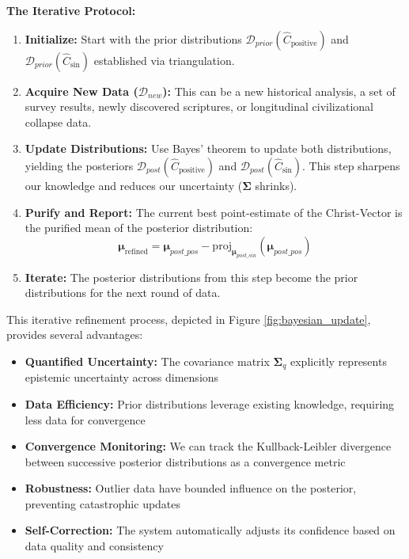 \documentclass[11pt,a4paper]{article}
\theoremstyle{definition}
\theoremstyle{remark}
\begin{document}
\textbf{The Iterative Protocol:}
\begin{enumerate}
    \item \textbf{Initialize:} Start with the prior distributions \(\mathcal{D}_{prior}(\hat{C}_{\text{positive}})\) and \(\mathcal{D}_{prior}(\hat{C}_{\text{sin}})\) established via triangulation.
    
    \item \textbf{Acquire New Data (\(\mathcal{D}_{new}\)):} This can be a new historical analysis, a set of survey results, newly discovered scriptures, or longitudinal civilizational collapse data.
    
    \item \textbf{Update Distributions:} Use Bayes' theorem to update both distributions, yielding the posteriors \(\mathcal{D}_{post}(\hat{C}_{\text{positive}})\) and \(\mathcal{D}_{post}(\hat{C}_{\text{sin}})\). This step sharpens our knowledge and reduces our uncertainty (\(\boldsymbol{\Sigma}\) shrinks).
    
    \item \textbf{Purify and Report:} The current best point-estimate of the Christ-Vector is the purified mean of the posterior distribution:
    \begin{equation}
    \boldsymbol{\mu}_{\text{refined}} = \boldsymbol{\mu}_{post\_pos} - \text{proj}_{\boldsymbol{\mu}_{post\_sin}}(\boldsymbol{\mu}_{post\_pos})
    \end{equation}
    
    \item \textbf{Iterate:} The posterior distributions from this step become the prior distributions for the next round of data.
\end{enumerate}

This iterative refinement process, depicted in Figure \ref{fig:bayesian_update}, provides several advantages:
\begin{itemize}
    \item \textbf{Quantified Uncertainty:} The covariance matrix \(\boldsymbol{\Sigma}_q\) explicitly represents epistemic uncertainty across dimensions
    \item \textbf{Data Efficiency:} Prior distributions leverage existing knowledge, requiring less data for convergence
    \item \textbf{Convergence Monitoring:} We can track the Kullback-Leibler divergence between successive posterior distributions as a convergence metric
    \item \textbf{Robustness:} Outlier data have bounded influence on the posterior, preventing catastrophic updates
    \item \textbf{Self-Correction:} The system automatically adjusts its confidence based on data quality and consistency
\end{itemize}
\end{document}
